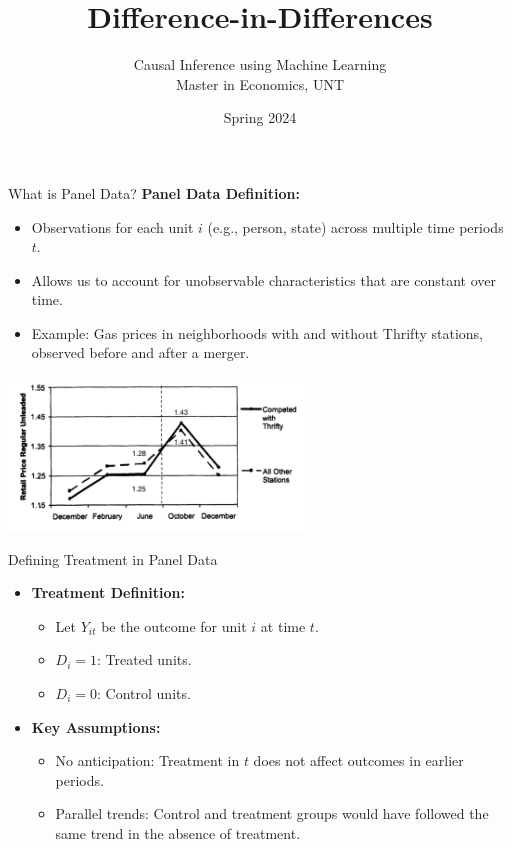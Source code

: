 \documentclass[xcolor=svgnames,t]{beamer}
\title[Difference-in-Differences]{Difference-in-Differences}
\subtitle{}
\author[CIML ]{Causal Inference using Machine Learning\\ Master in Economics, UNT}
\institute[]{Andres Mena}
\date{Spring 2024}
\begin{document}
\begin{frame}
\maketitle
\end{frame}

\begin{frame}{What is Panel Data?}
    \textbf{Panel Data Definition:}
    \begin{itemize}
        \item Observations for each unit \(i\) (e.g., person, state) across multiple time periods \(t\).
        \item Allows us to account for unobservable characteristics that are constant over time.
        \pause
        \item Example: Gas prices in neighborhoods with and without Thrifty stations, observed before and after a merger.
    \end{itemize}
    \centering
    \includegraphics[width=0.6\textwidth]{Figures/hastings_example.png}
    \end{frame}
    
    \begin{frame}{Defining Treatment in Panel Data}
    \begin{itemize}
        \item \textbf{Treatment Definition:}
        \begin{itemize}
            \item Let \(Y_{it}\) be the outcome for unit \(i\) at time \(t\).
            \item \(D_i = 1\): Treated units.
            \item \(D_i = 0\): Control units.
        \end{itemize}
        \pause
        \item \textbf{Key Assumptions:}
        \begin{itemize}
            \item No anticipation: Treatment in \(t\) does not affect outcomes in earlier periods.
            \item Parallel trends: Control and treatment groups would have followed the same trend in the absence of treatment.
        \end{itemize}
    \end{itemize}
    \end{frame}
    
\end{document}
